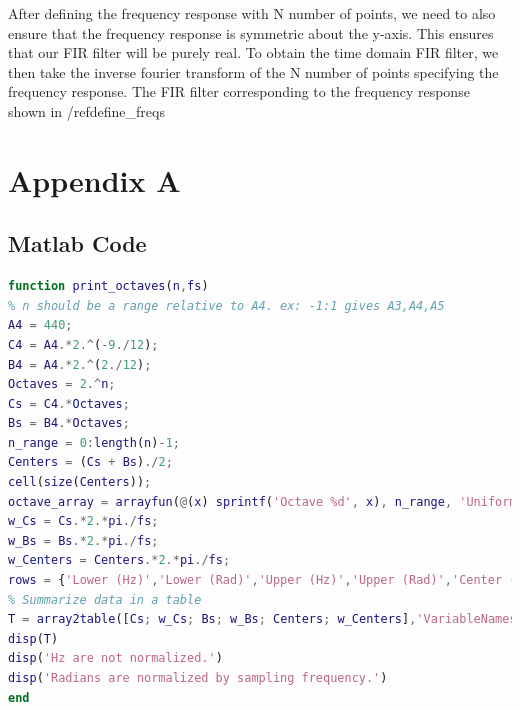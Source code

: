 \documentclass[a4paper, 11pt]{exam}
\begin{document}
After defining the frequency response with N number of points, we need to also ensure that the frequency response is symmetric about the y-axis. This ensures that our FIR filter will be purely real. To obtain the time domain FIR filter, we then take the inverse fourier transform of the N number of points specifying the frequency response. The FIR filter corresponding to the frequency response shown in /ref{define_freqs} 

\newpage
\section*{Appendix A}
\subsection{Matlab Code}
\begin{lstlisting}[language=Matlab]
function print_octaves(n,fs)
% n should be a range relative to A4. ex: -1:1 gives A3,A4,A5
A4 = 440;
C4 = A4.*2.^(-9./12);
B4 = A4.*2.^(2./12);
Octaves = 2.^n;
Cs = C4.*Octaves;
Bs = B4.*Octaves;
n_range = 0:length(n)-1;
Centers = (Cs + Bs)./2;
cell(size(Centers));
octave_array = arrayfun(@(x) sprintf('Octave %d', x), n_range, 'UniformOutput', false);
w_Cs = Cs.*2.*pi./fs;
w_Bs = Bs.*2.*pi./fs;
w_Centers = Centers.*2.*pi./fs;
rows = {'Lower (Hz)','Lower (Rad)','Upper (Hz)','Upper (Rad)','Center (Hz)','Center (Rad)'};
% Summarize data in a table
T = array2table([Cs; w_Cs; Bs; w_Bs; Centers; w_Centers],'VariableNames',octave_array,'RowName',rows);
disp(T)
disp('Hz are not normalized.')
disp('Radians are normalized by sampling frequency.')
end 
\end{lstlisting}
\end{document}
